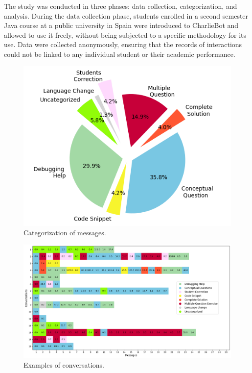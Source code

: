\documentclass[a4paper,twoside]{article}
\begin{document}
The study was conducted in three phases: data collection,
categorization, and analysis. During the data collection phase, students
enrolled in a second semester Java course at a public university in Spain were
introduced to CharlieBot and allowed to use it freely, without being subjected
to a specific methodology for its use. Data were collected anonymously, ensuring
that the records of interactions could not be linked to any individual student
or their academic performance.

\begin{figure}[h!]
  \centering
  \includegraphics[scale=0.62]{img/figure1.png}
  \caption{Categorization of messages.}
  \label{fig:graph1}
\end{figure}

\begin{figure}[htbp]
  \centering
  \includegraphics[scale=0.45]{img/figure2.png}
  \caption{Examples of conversations.}
  \label{fig:graph2}
\end{figure}
\end{document}
